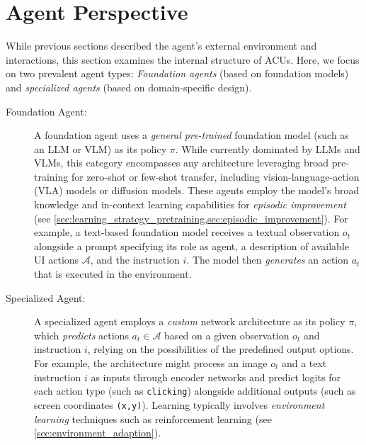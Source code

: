 \section{Agent Perspective}\label{sec:conceptional_view}

While previous sections described the agent's external environment and interactions, this section examines the internal structure of ACUs.
Here, we focus on two prevalent agent types: \emph{Foundation agents} (based on foundation models) and \emph{specialized agents} (based on domain-specific design).

\begin{description}
    \item[Foundation Agent:] \label{sec:foundation_agent}
    A foundation agent  uses a \emph{general pre-trained} foundation model (such as an LLM or VLM) as its policy $\pi$. While currently dominated by LLMs and VLMs, this category encompasses any architecture leveraging broad pre-training for zero-shot or few-shot transfer, including vision-language-action (VLA) models or diffusion models. These agents employ the model's broad knowledge and in-context learning capabilities for \emph{episodic improvement} (see \cref{sec:learning_strategy_pretraining,sec:episodic_improvement}).
    For example, a text-based foundation model receives a textual observation $o_t$ alongside a prompt specifying its role as agent, a description of available UI actions $\mathcal{A}$, and the instruction $i$. The model then \emph{generates} an action $a_t$ that is executed in the environment.
    \item[Specialized Agent:] \label{sec:reinforce_agent}
    A specialized agent  employs a \emph{custom} network architecture as its policy $\pi$, which \emph{predicts} actions $a_t \in \mathcal{A}$ based on a given observation $o_t$ and instruction $i$, relying on the possibilities of the predefined output options.
    For example, the architecture might process an image $o_t$ and a text instruction $i$ as inputs through encoder networks and predict logits for each action type (such as \texttt{clicking}) alongside additional outputs (such as screen coordinates \texttt{(x,y)}). 
    Learning typically involves \emph{environment learning} techniques such as reinforcement learning (see \cref{sec:environment_adaption}).
\end{description}

